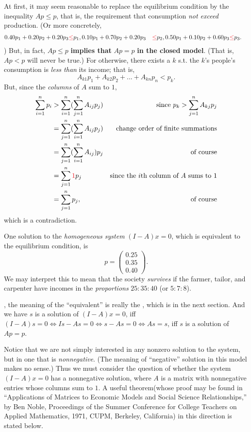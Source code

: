 At first, it may seem reasonable to replace the equilibrium condition by the inequality \(Ap \le p\), that is, the requirement that consumption \emph{not exceed} production.
(Or more concretely,
\begin{align*}
    0.40 p_1 + 0.20 p_2 + 0.20 p_3 & \RED{\le} p_1,
    0.10 p_1 + 0.70 p_2 + 0.20 p_3 & \RED{\le} p_2,
    0.50 p_1 + 0.10 p_2 + 0.60 p_3 & \RED{\le} p_3.
\end{align*}
)
But, in fact, \(Ap \le p\) \textbf{implies that} \(Ap = p\) \textbf{in the closed model}.
(That is, \(Ap < p\) will never be true.)
For otherwise, there exists a \(k\) s.t. the \(k\)'s people's consumption is \emph{less than} its income;
that is,
\[
    A_{k1} p_{1} + A_{k2} p_{2} + ... + A_{kn} p_n < p_k.
\]
But, since the \emph{columns} of \(A\) sum to \(1\),
\begin{align*}
    \sum_{i = 1}^n p_i & > \sum_{i = 1}^n (\sum_{j = 1}^n A_{ij} p_j) & \text{since \(p_k > \sum_{j = 1}^n A_{kj} p_j\)}\\
                       & = \sum_{j = 1}^n (\sum_{i = 1}^n A_{ij} p_j) & \text{change order of finite summations} \\
                       & = \sum_{j = 1}^n (\sum_{i = 1}^n A_{ij}) p_j & \text{of course} \\
                       & = \sum_{j = 1}^n \RED{1} p_j & \text{since the \(i\)th column of \(A\) sums to \(1\)} \\
                       & = \sum_{j = 1}^n p_j, & \text{of course}
\end{align*}
which is a contradiction.

One solution to the \emph{homogeneous system} \((I - A)x = 0\), which is equivalent\RED{*} to the equilibrium condition, is
\[
    p = \begin{pmatrix} 0.25 \\ 0.35 \\ 0.40 \end{pmatrix}.
\]
We may interpret this to mean that the society \emph{survives} if the farmer, tailor, and carpenter have incomes in the \emph{proportions} \(25 : 35 : 40\) (or \(5 : 7 : 8\)).
\begin{note}
\RED{*}, the meaning of the ``equivalent'' is really the , which is in the next section.
And we have \(s\) is a solution of \((I - A)x = 0\), iff \((I - A)s = 0 \iff Is - As = 0 \iff s - As = 0 \iff As = s\), iff \(s\) is a solution of \(Ap = p\).
\end{note}
Notice that we are not simply interested in any nonzero solution to the system, but in one that is \emph{nonnegative}.
(The meaning of ``negative'' solution in this model makes no sense.)
Thus we must consider the question of whether the system \((I - A)x = 0\) has a nonnegative solution, where \(A\) is a matrix with nonnegative entries whose columns sum to \(1\).
A useful theorem(whose proof may be found in ``Applications of Matrices to Economic Models and Social Science Relationships,'' by Ben Noble, Proceedings of the Summer Conference for College Teachers on Applied Mathematics, 1971, CUPM, Berkeley, California) in this direction is stated below.

